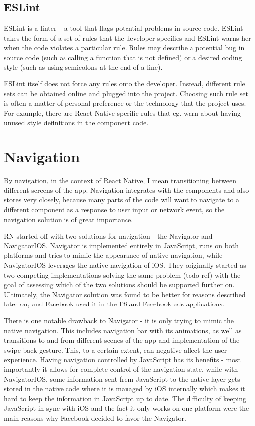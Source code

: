 \subsection{ESLint}

ESLint is a linter -- a tool that flags potential problems in source code. ESLint takes the form of a set of rules that the developer specifies and ESLint warns her when the code violates a particular rule. Rules may describe a potential bug in source code (such as calling a function that is not defined) or a desired coding style (such as using semicolons at the end of a line).

ESLint itself does not force any rules onto the developer. Instead, different rule sets can be obtained online and plugged into the project. Choosing such rule set is often a matter of personal preference or the technology that the project uses. For example, there are React Native-specific rules that eg. warn about having unused style definitions in the component code.

\section{Navigation}

By navigation, in the context of React Native, I mean transitioning between different screens of the app. Navigation integrates with the components and also stores very closely, because many parts of the code will want to navigate to a different component as a response to user input or network event, so the navigation solution is of great importance. 

RN started off with two solutions for navigation - the Navigator and NavigatorIOS. Navigator is implemented entirely in JavaScript, runs on both platforms and tries to mimic the appearance of native navigation, while NavigatorIOS leverages the native navigation of iOS.
They originally started as two competing implementations solving the same problem (todo ref) with the goal of assessing which of the two solutions should be supported further on. Ultimately, the Navigator solution was found to be better for reasons described later on, and Facebook used it in the F8 and Facebook ads applications. 


There is one notable drawback to Navigator - it is only trying to mimic the native navigation. This includes navigation bar with its animations, as well as transitions to and from different scenes of the app and implementation of the swipe back gesture. This, to a certain extent, can negative affect the user experience.
Having navigation controlled by JavaScript has its benefits - most importantly it allows for complete control of the navigation state, while with NavigatorIOS, some information sent from JavaScript to the native layer gets stored in the native code where it is managed by iOS internally which makes it hard to keep the information in JavaScript up to date. The difficulty of keeping JavaScript in sync with iOS and the fact it only works on one platform were the main reasons why Facebook decided to favor the Navigator.

